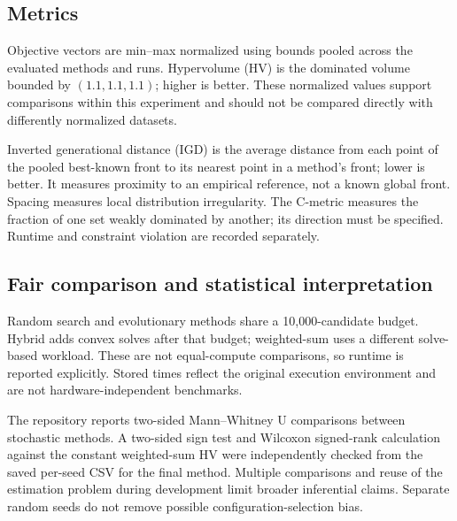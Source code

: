 \documentclass[12pt,a4paper]{article}
\begin{document}
\subsection{Metrics}
Objective vectors are min--max normalized using bounds pooled across the evaluated methods and runs. Hypervolume (HV) is the dominated volume bounded by $(1.1,1.1,1.1)$; higher is better. These normalized values support comparisons within this experiment and should not be compared directly with differently normalized datasets.

Inverted generational distance (IGD) is the average distance from each point of the pooled best-known front to its nearest point in a method's front; lower is better. It measures proximity to an empirical reference, not a known global front. Spacing measures local distribution irregularity. The C-metric measures the fraction of one set weakly dominated by another; its direction must be specified. Runtime and constraint violation are recorded separately.
\subsection{Fair comparison and statistical interpretation}
Random search and evolutionary methods share a 10,000-candidate budget. Hybrid adds convex solves after that budget; weighted-sum uses a different solve-based workload. These are not equal-compute comparisons, so runtime is reported explicitly. Stored times reflect the original execution environment and are not hardware-independent benchmarks.

The repository reports two-sided Mann--Whitney U comparisons between stochastic methods. A two-sided sign test and Wilcoxon signed-rank calculation against the constant weighted-sum HV were independently checked from the saved per-seed CSV for the final method. Multiple comparisons and reuse of the estimation problem during development limit broader inferential claims. Separate random seeds do not remove possible configuration-selection bias.
\end{document}

